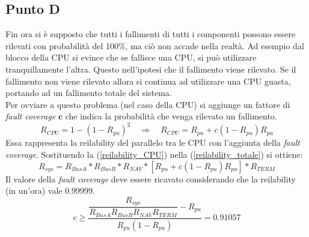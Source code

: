 \subsection{Punto D}
Fin ora si è supposto che tutti i fallimenti di tutti i componenti possono essere rilevati con probabilità del 100\%, ma ciò non accade nella realtà. Ad esempio dal blocco della CPU si evince che se fallisce una CPU, si può utilizzare tranquillamente l'altra. Questo nell'ipotesi che il fallimento viene rilevato. Se il fallimento non viene rilevato allora si continua ad utilizzare una CPU guasta, portando ad un fallimento totale del sistema. 
\\Per ovviare a questo problema (nel caso della CPU) si aggiunge un fattore di \textit{fault coverage} $\textbf{c}$ che indica la probabilità che venga rilevato un fallimento.
\begin{equation}
	\label{reilability_CPU}
	R_{CPU} = 1-(1-R_{pu})^2 \quad\Rightarrow\quad R_{CPU} = R_{pu} + c(1-R_{pu})R_{pu}
\end{equation}
Essa rappresenta la reilability del parallelo tra le CPU con l'aggiunta della \textit{fault coverage}. Sostituendo la (\ref{reilability_CPU}) nella (\ref{reilability_totale}) si ottiene:
\begin{equation*}
	R_{sys} = R_{BusA} * R_{BusB} * R_{NAV} * [R_{pu} + c(1-R_{pu})R_{pu} ]* R_{TERM} 
\end{equation*}
Il valore della \textit{fault coverage} deve essere ricavato considerando che la reilability (in un'ora) vale 0.99999.
\begin{equation}
	c \geq \dfrac{\dfrac{R_{sys}}{R_{BusA}R_{BusB}R_{NAV}R_{TERM}} - R_{pu}}{R_{pu}(1-R_{pu})} = 0.91057
\end{equation}
